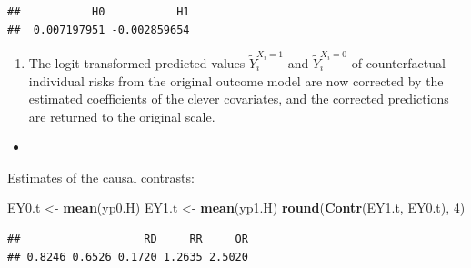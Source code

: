 \documentclass[
]{book}
\newenvironment{Shaded}{\begin{snugshade}}{\end{snugshade}}
\newcommand{\DecValTok}[1]{\textcolor[rgb]{0.00,0.00,0.81}{#1}}
\newcommand{\FunctionTok}[1]{\textcolor[rgb]{0.13,0.29,0.53}{\textbf{#1}}}
\newcommand{\NormalTok}[1]{#1}
\newcommand{\OtherTok}[1]{\textcolor[rgb]{0.56,0.35,0.01}{#1}}
\newcommand{\SpecialCharTok}[1]{\textcolor[rgb]{0.81,0.36,0.00}{\textbf{#1}}}
\providecommand{\tightlist}{%
  \setlength{\itemsep}{0pt}\setlength{\parskip}{0pt}}
\begin{document}
\begin{verbatim}
##           H0           H1 
##  0.007197951 -0.002859654
\end{verbatim}

\begin{enumerate}
\def\labelenumi{\arabic{enumi}.}
\setcounter{enumi}{2}
\tightlist
\item
  The logit-transformed predicted values \(\widetilde{Y}_i^{X_i=1}\) and
  \(\widetilde{Y}_i^{X_i=0}\) of counterfactual individual risks from
  the original outcome model are now corrected by the estimated
  coefficients of the clever covariates, and the corrected predictions
  are returned to the original scale.
\end{enumerate}

\begin{Shaded}
\end{Shaded}

\begin{itemize}
\tightlist
\item
\end{itemize}

Estimates of the causal contrasts:

\begin{Shaded}
\begin{Highlighting}[]
\NormalTok{EY0.t }\OtherTok{\textless{}{-}} \FunctionTok{mean}\NormalTok{(yp0.H)}
\NormalTok{EY1.t }\OtherTok{\textless{}{-}} \FunctionTok{mean}\NormalTok{(yp1.H)}
\FunctionTok{round}\NormalTok{(}\FunctionTok{Contr}\NormalTok{(EY1.t, EY0.t), }\DecValTok{4}\NormalTok{)}
\end{Highlighting}
\end{Shaded}

\begin{verbatim}
##                   RD     RR     OR 
## 0.8246 0.6526 0.1720 1.2635 2.5020
\end{verbatim}
\end{document}
